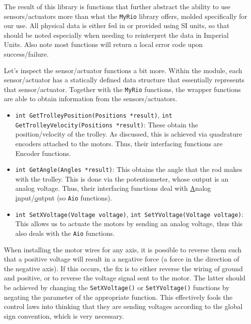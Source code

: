 \documentclass[letterpaper]{article}
\begin{document}
The result of this library is functions that further abstract the ability to use sensors/actuators more than what the \texttt{MyRio} library offers, molded specifically for our use. All physical data is either fed in or provided using SI units, so that should be noted especially when needing to reinterpret the data in Imperial Units. Also note most functions will return a local error code upon success/failure.

Let's inspect the sensor/actuator functions a bit more. Within the module, each sensor/actuator has a statically defined data structure that essentially represents that sensor/actuator. Together with the \texttt{MyRio} functions, the wrapper functions are able to obtain information from the sensors/actuators.
\begin{itemize}
    \item \texttt{int GetTrolleyPosition(Positions *result)}, \texttt{int GetTrolleyVelocity(Positions *result)}: These obtain the position/velocity of the trolley. As discussed, this is achieved via quadrature encoders attached to the motors. Thus, their interfacing functions are Encoder functions.
    \item \texttt{int GetAngle(Angles *result)}: This obtains the angle that the rod makes with the trolley. This is done via the potentiometer, whose output is an analog voltage. Thus, their interfacing functions deal with \underline{A}nalog \underline{i}nput/\underline{o}utput (so \texttt{Aio} functions).
    \item \texttt{int SetXVoltage(Voltage voltage)}, \texttt{int SetYVoltage(Voltage voltage)}: This allows us to actuate the motors by sending an analog voltage, thus this also deals with the \texttt{Aio} functions.
\end{itemize}

\begin{tcolorbox}[colframe=red!75!black,colback=yellow!5, title=WARNING]
    When installing the motor wires for any axis, it is possible to reverse them such that a positive voltage will result in a negative force (a force in the direction of the negative axis). If this occurs, the fix is to either reverse the wiring of ground and positive, or to reverse the voltage signal sent to the motor. The latter should be achieved by changing the \texttt{SetXVoltage()} or \texttt{SetYVoltage()} functions by negating the parameter of the appropriate function. This effectively fools the control laws into thinking that they are sending voltages according to the global sign convention, which is very necessary.
\end{tcolorbox}
\end{document}

